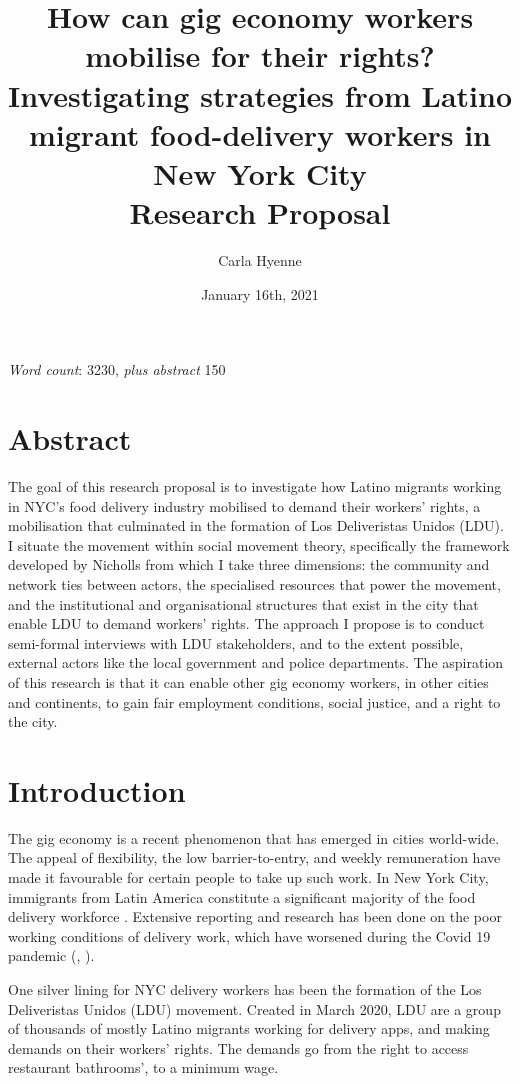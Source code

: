\documentclass{article}
\title{How can gig economy workers mobilise for their rights? Investigating strategies from Latino migrant food-delivery workers in New York City \\[5ex]Research Proposal \\[3ex]}
\author{Carla Hyenne}
\date{January 16th, 2021}
\begin{document}
\maketitle

\textit{Word count}: 3230, \textit{plus abstract} 150

\section{Abstract}

The goal of this research proposal is to investigate how Latino migrants working in NYC’s food delivery industry mobilised to demand their workers’ rights, a mobilisation that culminated in the formation of Los Deliveristas Unidos (LDU).
I situate the movement within social movement theory, specifically the framework developed by Nicholls from which I take three dimensions: the community and network ties between actors, the specialised resources that power the movement, and the institutional and organisational structures that exist in the city that enable LDU to demand workers' rights.
The approach I propose is to conduct semi-formal interviews with LDU stakeholders, and to the extent possible, external actors like the local government and police departments.
The aspiration of this research is that it can enable other gig economy workers, in other cities and continents, to gain fair employment conditions, social justice, and a right to the city.

\pagebreak

\section{Introduction}

The gig economy is a recent phenomenon that has emerged in cities world-wide. The appeal of flexibility, the low barrier-to-entry, and weekly remuneration have made it favourable for certain people to take up such work. In New York City, immigrants from Latin America constitute a significant majority of the food delivery workforce \parencite{ldu_report2021}. Extensive reporting and research has been done on the poor working conditions of delivery work, which have worsened during the Covid 19 pandemic (\parencite{newyorker2020uncertain}, \parencite{nytimes2021risk}).

One silver lining for NYC delivery workers has been the formation of the Los Deliveristas Unidos (LDU) movement. Created in March 2020, LDU are a group of thousands of mostly Latino migrants working for delivery apps, and making demands on their workers’ rights. The demands go from the right to access restaurant bathrooms’, to a minimum wage. 
\end{document}
